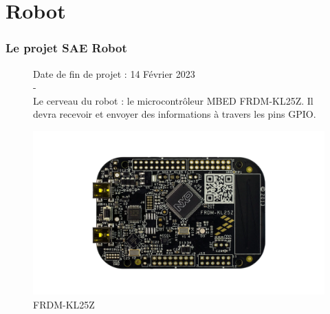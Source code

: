\section{Robot}

\begin{frame}
    \frametitle{Le projet SAE Robot}

    
    \begin{figure}[H]
        \centering
        \begin{minipage}{.5\textwidth}
            \centering
            Date de fin de projet : 14 Février 2023
            \\ - \\
            Le cerveau du robot : le microcontrôleur MBED FRDM-KL25Z. Il devra recevoir et envoyer des informations à travers les pins GPIO. 
        \end{minipage}%
        \begin{minipage}{.5\textwidth}
            \centering
            \includegraphics[width=.7\linewidth]{Images/frdmkl25z.png}
            \caption{FRDM-KL25Z}
            \label{fig:µC}
        \end{minipage}%
    \end{figure}
    
\vfill\footer{\hfill\insertframenumber/\inserttotalframenumber}
\end{frame}

